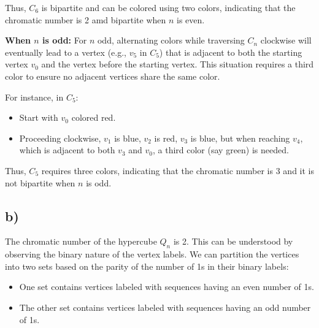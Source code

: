 \documentclass[12pt]{article}
\begin{document}
Thus, \( C_6 \) is bipartite and can be colored using two colors, indicating that the chromatic number is 2 amd bipartite when \( n \) is even.

\textbf{When \( n \) is odd:}
For \( n \) odd, alternating colors while traversing \( C_n \) clockwise will eventually lead to a vertex (e.g., \( v_5 \) in \( C_5 \)) that is adjacent to both the starting vertex \( v_0 \) and the vertex before the starting vertex. This situation requires a third color to ensure no adjacent vertices share the same color.

For instance, in \( C_5 \):

\begin{itemize}
    \item Start with \( v_0 \) colored red.
    \item Proceeding clockwise, \( v_1 \) is blue, \( v_2 \) is red, \( v_3 \) is blue, but when reaching \( v_4 \), which is adjacent to both \( v_3 \) and \( v_0 \), a third color (say green) is needed.
\end{itemize}


Thus, \( C_5 \) requires three colors, indicating that the chromatic number is 3 and it is not bipartite when \( n \) is odd.


\subsection*{b)}

The chromatic number of the hypercube \( Q_n \) is 2. This can be understood by observing the binary nature of the vertex labels. We can partition the vertices into two sets based on the parity of the number of 1s in their binary labels:

\begin{itemize}
    \item One set contains vertices labeled with sequences having an even number of 1s.
    \item The other set contains vertices labeled with sequences having an odd number of 1s.
\end{itemize}
\end{document}
